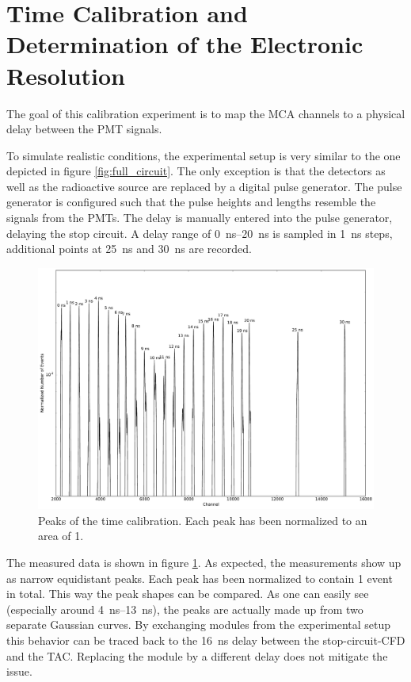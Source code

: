 \documentclass[
	paper=A4,
	parskip=full,
	chapterprefix=true,
	11pt,
	headings=normal,
	bibliography=totoc,
	listof=totoc,
	titlepage=on,
]{scrreprt}
\begin{document}
\FloatBarrier
\section{Time Calibration and Determination of the Electronic Resolution}
\label{time_calib}
The goal of this calibration experiment is to map the MCA channels to a physical delay between the PMT signals. 

To simulate realistic conditions, the experimental setup is very similar to the one depicted in figure \ref{fig:full_circuit}. The only  exception is that the detectors as well as the radioactive source are replaced by a digital pulse generator. The pulse generator is configured such that the pulse heights and lengths resemble the signals from the PMTs.  
The delay is manually entered into the pulse generator, delaying the stop circuit. A delay range of \SIrange{0}{20}{\nano\second} is sampled in \SI{1}{\nano\second} steps, additional points at \SI{25}{\nano\second} and \SI{30}{\nano\second} are recorded.

\begin{figure}
	\centering
	\includegraphics{calibration_peaks}
	\caption{Peaks of the time calibration. Each peak has been normalized to an area of \num{1}.}
	\label{fig:calibration_raw}
\end{figure}

The measured data is shown in figure \ref{fig:calibration_raw}. As expected, the measurements show up as narrow equidistant peaks. Each peak has been normalized to contain \num{1} event in total. This way the peak shapes can be compared. As one can easily see (especially around \SIrange{4}{13}{\nano\second}), the peaks are actually made up from two separate Gaussian curves. By exchanging modules from the experimental setup this behavior can be traced back to the \SI{16}{\nano\second} delay between the stop-circuit-CFD and the TAC. Replacing the module by a different delay does not mitigate the issue.
\end{document}
